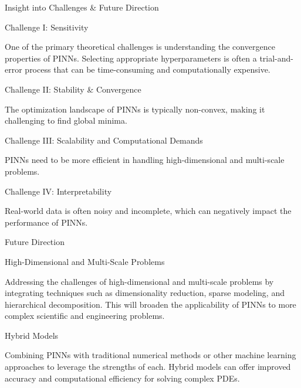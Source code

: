 \begin{frame}{Insight into Challenges \& Future Direction}
 
    \begin{block}{Challenge I: Sensitivity}
    
        One of the primary theoretical challenges is understanding the convergence properties of PINNs. Selecting appropriate hyperparameters is often a trial-and-error process that can be time-consuming and computationally expensive. 

    \end{block}

    \begin{block}{Challenge II: Stability \& Convergence}
    
        The optimization landscape of PINNs is typically non-convex, making it challenging to find global minima.  

    \end{block}
\end{frame}
\begin{frame}
 
    \begin{block}{Challenge III: Scalability and Computational Demands}
    
        PINNs need to be more efficient in handling high-dimensional and multi-scale problems.

    \end{block}

    \begin{block}{Challenge IV: Interpretability}
    
        Real-world data is often noisy and incomplete, which can negatively impact the performance of PINNs. 

    \end{block}
\end{frame}
\begin{frame}{Future Direction}
 
    \begin{block}{High-Dimensional and Multi-Scale Problems}
    
        Addressing the challenges of high-dimensional and multi-scale problems by integrating techniques such as dimensionality reduction, sparse modeling, and hierarchical decomposition. This will broaden the applicability of PINNs to more complex scientific and engineering problems. 

    \end{block}

    \begin{block}{Hybrid Models}
    
        Combining PINNs with traditional numerical methods or other machine learning approaches to leverage the strengths of each. Hybrid models can offer improved accuracy and computational efficiency for solving complex PDEs. 

    \end{block}
\end{frame}
